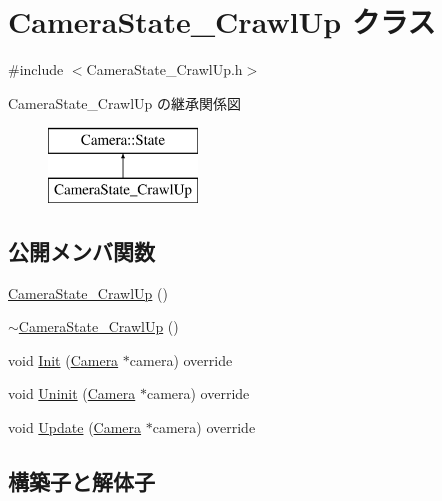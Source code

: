 \hypertarget{class_camera_state___crawl_up}{}\section{Camera\+State\+\_\+\+Crawl\+Up クラス}
\label{class_camera_state___crawl_up}


{\ttfamily \#include $<$Camera\+State\+\_\+\+Crawl\+Up.\+h$>$}

Camera\+State\+\_\+\+Crawl\+Up の継承関係図\begin{figure}[H]
\begin{center}
\leavevmode
\includegraphics[height=2.000000cm]{class_camera_state___crawl_up}
\end{center}
\end{figure}
\subsection*{公開メンバ関数}
\begin{DoxyCompactItemize}
\item 
\mbox{\hyperlink{class_camera_state___crawl_up_a75741967576f6f544007ad8ccc574202}{Camera\+State\+\_\+\+Crawl\+Up}} ()
\item 
\mbox{\hyperlink{class_camera_state___crawl_up_a9b7f2e6cc8be5c356967d8df8c20e93a}{$\sim$\+Camera\+State\+\_\+\+Crawl\+Up}} ()
\item 
void \mbox{\hyperlink{class_camera_state___crawl_up_a43a47eb4e7445c6801e8316c5a635709}{Init}} (\mbox{\hyperlink{class_camera}{Camera}} $\ast$camera) override
\item 
void \mbox{\hyperlink{class_camera_state___crawl_up_ac9822b09d8e5fa9e1def7ac8a1e9c893}{Uninit}} (\mbox{\hyperlink{class_camera}{Camera}} $\ast$camera) override
\item 
void \mbox{\hyperlink{class_camera_state___crawl_up_aaebd2634f1677b7c00e6761ed91e1264}{Update}} (\mbox{\hyperlink{class_camera}{Camera}} $\ast$camera) override
\end{DoxyCompactItemize}


\subsection{構築子と解体子}
\mbox{\label{class_camera_state___crawl_up_a75741967576f6f544007ad8ccc574202}} 
